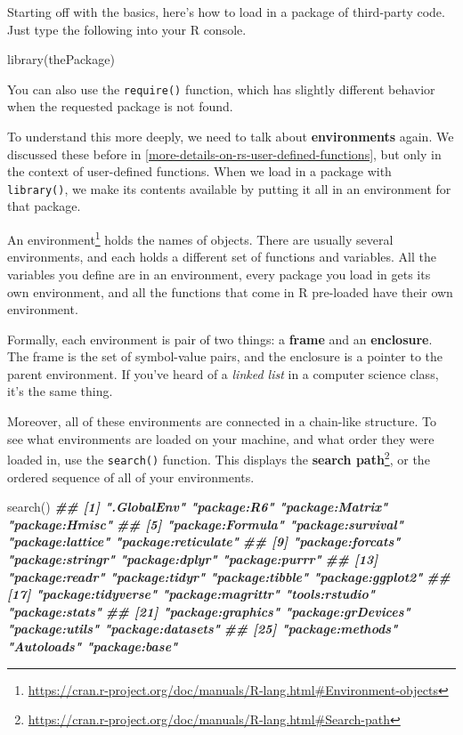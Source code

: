 \documentclass[
  12pt,
]{krantz}
\makeatletter
\newenvironment{Shaded}{\begin{snugshade}}{\end{snugshade}}
\newcommand{\DocumentationTok}[1]{\textcolor[rgb]{0.37,0.37,0.37}{\textbf{\textit{#1}}}}
\newcommand{\FunctionTok}[1]{\textcolor[rgb]{0,0,0}{#1}}
\newcommand{\NormalTok}[1]{#1}
\renewcommand{\href}[2]{#2\footnote{\url{#1}}}
\newenvironment{kframe}{%
\medskip{}
\setlength{\fboxsep}{.8em}
 \def\at@end@of@kframe{}%
 \ifinner\ifhmode%
  \def\at@end@of@kframe{\end{minipage}}%
  \begin{minipage}{\columnwidth}%
 \fi\fi%
 \def\FrameCommand##1{\hskip\@totalleftmargin \hskip-\fboxsep
 \colorbox{shadecolor}{##1}\hskip-\fboxsep
     \hskip-\linewidth \hskip-\@totalleftmargin \hskip\columnwidth}%
 \MakeFramed {\advance\hsize-\width
   \@totalleftmargin\z@ \linewidth\hsize
   \@setminipage}}%
 {\par\unskip\endMakeFramed%
 \at@end@of@kframe}
\renewenvironment{Shaded}{\begin{kframe}}{\end{kframe}}
\makeatother
\begin{document}
Starting off with the basics, here's how to load in a package of third-party code. Just type the following into your R console.

\begin{Shaded}
\begin{Highlighting}[]
\FunctionTok{library}\NormalTok{(thePackage)}
\end{Highlighting}
\end{Shaded}

You can also use the \texttt{require()} function, which has slightly different behavior when the requested package is not found.

To understand this more deeply, we need to talk about \textbf{environments} again. We discussed these before in \ref{more-details-on-rs-user-defined-functions}, but only in the context of user-defined functions. When we load in a package with \texttt{library()}, we make its contents available by putting it all in an environment for that package.

An \href{https://cran.r-project.org/doc/manuals/R-lang.html\#Environment-objects}{environment} holds the names of objects. There are usually several environments, and each holds a different set of functions and variables. All the variables you define are in an environment, every package you load in gets its own environment, and all the functions that come in R pre-loaded have their own environment.

Formally, each environment is pair of two things: a \textbf{frame} and an \textbf{enclosure}. The frame is the set of symbol-value pairs, and the enclosure is a pointer to the parent environment. If you've heard of a \emph{linked list} in a computer science class, it's the same thing.

Moreover, all of these environments are connected in a chain-like structure. To see what environments are loaded on your machine, and what order they were loaded in, use the \texttt{search()} function. This displays the \href{https://cran.r-project.org/doc/manuals/R-lang.html\#Search-path}{\textbf{search path}}, or the ordered sequence of all of your environments.

\begin{Shaded}
\begin{Highlighting}[]
\FunctionTok{search}\NormalTok{()}
\DocumentationTok{\#\#  [1] ".GlobalEnv"         "package:R6"         "package:Matrix"     "package:Hmisc"     }
\DocumentationTok{\#\#  [5] "package:Formula"    "package:survival"   "package:lattice"    "package:reticulate"}
\DocumentationTok{\#\#  [9] "package:forcats"    "package:stringr"    "package:dplyr"      "package:purrr"     }
\DocumentationTok{\#\# [13] "package:readr"      "package:tidyr"      "package:tibble"     "package:ggplot2"   }
\DocumentationTok{\#\# [17] "package:tidyverse"  "package:magrittr"   "tools:rstudio"      "package:stats"     }
\DocumentationTok{\#\# [21] "package:graphics"   "package:grDevices"  "package:utils"      "package:datasets"  }
\DocumentationTok{\#\# [25] "package:methods"    "Autoloads"          "package:base"}
\end{Highlighting}
\end{Shaded}
\end{document}
